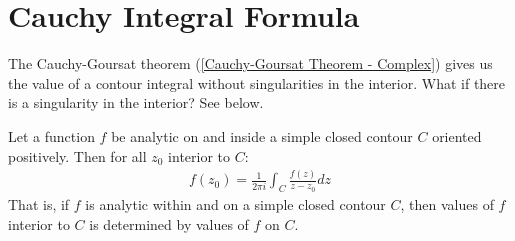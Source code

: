 \documentclass[12pt, english]{book}
\begin{document}
	


	\section{Cauchy Integral Formula} \label{Cauchy Integral Formula Section - Complex}
	
	The Cauchy-Goursat theorem (\cref{Cauchy-Goursat Theorem - Complex}) gives us the value of a contour integral without singularities in the interior. What if there is a singularity in the interior? See below.
	
	\begin{theorem}
		\label{Cauchy Integral Formula}
		Let a function \(f\) be analytic on and inside a simple closed contour \(C\) oriented positively. Then for all \(z_0\) interior to \(C\):
		\begin{align*}
			f(z_0) = \frac{1}{2\pi i} \int_{C} \frac{f(z)}{z - z_0} dz
		\end{align*}
		That is, if \(f\) is analytic within and on a simple closed contour \(C\), then values of \(f\) interior to \(C\) is determined by values of \(f\) on \(C\).
	\end{theorem}
\end{document}
